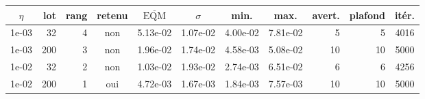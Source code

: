 \begin{tabular}{S[table-format=1e-2] r r c S[table-format=1.2e-2] S[table-format=1.2e-2] S[table-format=1.2e-2] S[table-format=1.2e-2] r r S[table-format=4]}
\toprule
{\(\eta\)} & {lot} & {rang} & {retenu} & {\(\overline{\mathrm{EQM}}\)} & {\(\sigma\)} & {min.} & {max.} & {avert.} & {plafond} & {it\'er.} \\
\midrule
1e-03 & 32 & 4 & non & 5.13e-02 & 1.07e-02 & 4.00e-02 & 7.81e-02 & 5 & 5 & 4016 \\
1e-03 & 200 & 3 & non & 1.96e-02 & 1.74e-02 & 4.58e-03 & 5.08e-02 & 10 & 10 & 5000 \\
1e-02 & 32 & 2 & non & 1.03e-02 & 1.93e-02 & 2.74e-03 & 6.51e-02 & 6 & 6 & 4256 \\
1e-02 & 200 & 1 & oui & 4.72e-03 & 1.67e-03 & 1.84e-03 & 7.57e-03 & 10 & 10 & 5000 \\
\bottomrule
\end{tabular}
